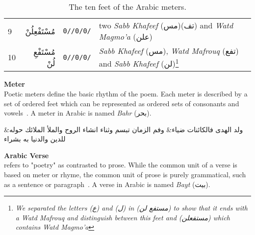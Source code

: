 \begin{savenotes}
\begin{table}[t]
\begin{tabular}{l r r l}
      9 &\textarabic{مُسْتَفْعِلُنْ} & \texttt{0//0/0/}  &  two \textit{Sabb Khafeef} (\textarabic{مس})(\textarabic{تف}) and \textit{Watd Magmo'a} (\textarabic{علن}) \\
      10 &\textarabic{مُسْتَفْعِ لُنْ} & \texttt{0//0/0/}  & \textit{Sabb Khafeef} (\textarabic{مس}), \textit{Watd Mafrouq}  (\textarabic{تفع}) and \textit{Sabb Khafeef}  (\textarabic{لن})\footnote{\textit{We separated the letters (\textarabic{ع}) and (\textarabic{ل}) in (\textarabic{مستفع لن}) to show that it ends with a \textit{Watd Mafrouq} and distinguish between this feet  and (\textarabic{مستفعلن}) which contains \textit{Watd Magmo'a} }}\\
      \hline
    \end{tabular}
    \caption{The ten feet of the Arabic meters. }\label{arud:feet}
  \end{table}
\end{savenotes}



\begin{definition}\label{def:meter}
  \textbf{Meter} \hfill \\
  Poetic meters define the basic rhythm of the poem. Each meter is described by a set of ordered feet which can be represented as ordered sets of consonants and vowels~\cite{Almuhareb2015}. A meter in Arabic is named \textit{Bahr} (\textarabic{بحر}).
  \begin{Arabic}
    \begin{traditionalpoem*}
      ولد الهدى فالكائنات ضياء\quad & \quad وفم الزمان تبسم وثناء انشاء
      الروح والملأ الملائك حوله\quad & \quad للدين والدنيا به بشراء
    \end{traditionalpoem*}
  \end{Arabic}%
\end{definition}

\begin{definition}\label{def:verse}
  \textbf{Arabic Verse} \hfill \\ refers to "poetry" as contrasted to prose. While the common unit of a verse is based on meter or rhyme, the common unit of prose is purely grammatical, such as a sentence or paragraph~\cite{Wiki_Verse}. A verse in Arabic is named \textit{Bayt} (\textarabic{بيت}).
\end{definition}

